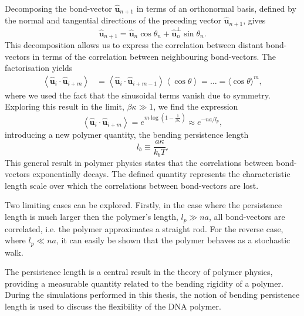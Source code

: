 Decomposing the bond-vector $\boldsymbol{\hat{u}}_{n+1}$ in terms of an orthonormal
basis, defined by the normal and tangential directions of the preceding vector
$\boldsymbol{\hat{u}}_{n+1}$, gives
\begin{equation}
\boldsymbol{\hat{u}}_{n+1} = \boldsymbol{\hat{u}}_{n} \cos \theta_{n} +
\boldsymbol{\hat{u}}_{n}^{\perp} \sin \theta_{n}.
\end{equation}
This decomposition allows us to express the correlation between distant bond-vectors in
terms of the correlation between neighbouring bond-vectors. The factorisation
yields
\begin{equation}
\begin{aligned}
    \left\langle\boldsymbol{\hat{u}}_{i} \cdot \boldsymbol{\hat{u}}_{i+m}\right\rangle
    &=\left\langle\boldsymbol{\hat{u}}_{i} \cdot
        \boldsymbol{\hat{u}}_{i+m-1}\right\rangle\left\langle\cos
    \theta\right\rangle = \dots =\langle\cos \theta\rangle^{m},
\end{aligned}
\end{equation}
where we used the fact that the sinusoidal terms vanish due to symmetry.
Exploring this result in the limit, $\beta \kappa \gg 1$, we find the expression
\begin{equation}
    \left\langle\boldsymbol{\hat{u}}_{i} \cdot \boldsymbol{\hat{u}}_{i+m}\right\rangle =
    e^{m \log(1 - \frac{1}{\beta \kappa})} \approx e^{-na/l_p},
\end{equation}
introducing a new polymer quantity, the bending persistence length
\begin{equation}
    l_b \equiv \frac{a \kappa}{k_{b} T}.
    \label{eq:persistance}
\end{equation}
This general result in polymer physics states that the correlations between bond-vectors
exponentially decays. The defined quantity represents the characteristic
length scale over which the correlations between bond-vectors are lost.

Two limiting cases can be explored. Firstly, in the
case where the persistence length is much larger then the polymer's length, $l_p \gg na$,
all bond-vectors are correlated, i.e. the polymer approximates a straight rod. For the
reverse case, where $l_p \ll na$, it can easily be shown that the polymer behaves as a
stochastic walk.

The persistence length is a central result in the theory of polymer physics, providing a
measurable quantity related to the bending rigidity of a polymer. During the
simulations performed in this thesis, the notion of bending persistence length is used to
discuss the flexibility of the DNA polymer.

